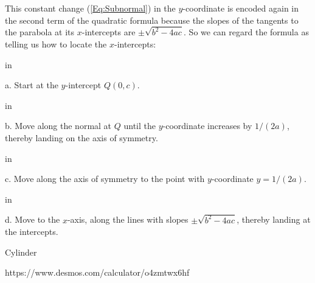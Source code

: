 \documentclass{ximera}
\newcommand{\pskip}{\vskip 0.1 in}
\begin{document}


This constant change (\ref{Eq:Subnormal}) in the $y$-coordinate is encoded again in the second term of the quadratic formula because the slopes of the tangents to the parabola at its $x$-intercepts are $\pm \sqrt{b^2-4ac}$. So we can regard the formula as telling us how to locate the $x$-intercepts:

\pskip

a. Start at the $y$-intercept $Q(0,c)$.

\pskip

b. Move along the normal at $Q$ until the $y$-coordinate increases by $1/(2a)$, thereby landing on the axis of symmetry. 

\pskip

c. Move along the axis of symmetry to the point with $y$-coordinate $y=1/(2a)$.

\pskip

d. Move to the $x$-axis, along the lines with slopes $\pm \sqrt{b^2-4ac}$, thereby landing at the intercepts.



\begin{exploration}\label{exp:orth1}
Cylinder
\begin{center}
\end{center}
\end{exploration}


https://www.desmos.com/calculator/o4zmtwx6hf
\end{document}
